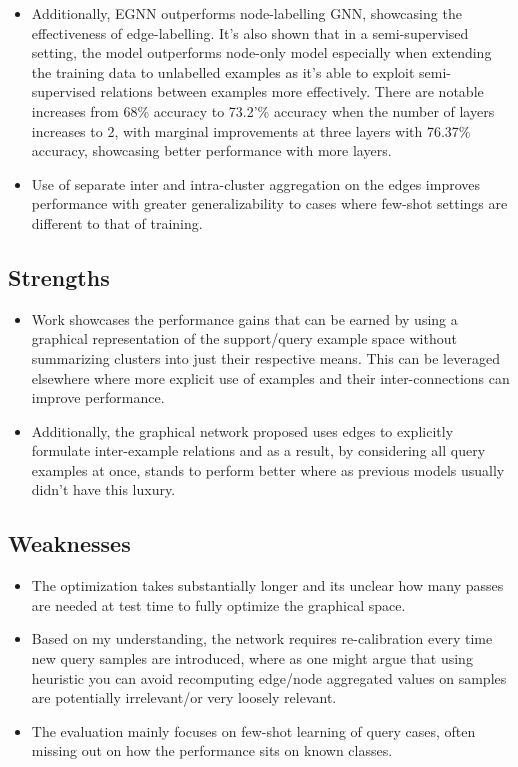 \documentclass{article}
\begin{document}
\begin{itemize}
    \item Additionally, EGNN outperforms node-labelling GNN, showcasing the effectiveness of edge-labelling. It's also shown that in a semi-supervised setting, the model outperforms node-only model especially when extending the training data to unlabelled examples as it's able to exploit semi-supervised relations between examples more effectively. There are notable increases from 68\% accuracy to 73.2'\% accuracy when the number of layers increases to 2, with marginal improvements at three layers with 76.37\% accuracy, showcasing better performance with more layers. 
    \item Use of separate inter and intra-cluster aggregation on the edges improves performance with greater generalizability to cases where few-shot settings are different to that of training.
\end{itemize}

\subsection{Strengths}
\begin{itemize}
    \item Work showcases the performance gains that can be earned by using a graphical representation of the support/query example space without summarizing clusters into just their respective means. This can be leveraged elsewhere where more explicit use of examples and their inter-connections can improve performance.
    \item Additionally, the graphical network proposed uses edges to explicitly formulate inter-example relations and as a result, by considering all query examples at once, stands to perform better where as previous models usually didn't have this luxury.
\end{itemize}

\subsection{Weaknesses}
\begin{itemize}
    \item The optimization takes substantially longer and its unclear how many passes are needed at test time to fully optimize the graphical space.
    \item Based on my understanding, the network requires re-calibration every time new query samples are introduced, where as one might argue that using heuristic you can avoid recomputing edge/node aggregated values on samples are potentially irrelevant/or very loosely relevant.
    \item The evaluation mainly focuses on few-shot learning of query cases, often missing out on how the performance sits on known classes.
\end{itemize}
\end{document}
